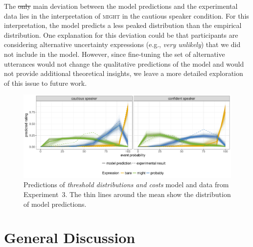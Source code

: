 \documentclass[man, floatsintext]{apa6}
\providecommand{\DIFdel}[1]{{\protect\color{red}\sout{#1}}}                      %
\providecommand{\DIFdelbegin}{} %
\providecommand{\DIFdelend}{} %
\newcommand{\DIFscaledelfig}{0.5}
\newlength{\DIFdelgraphicswidth} %
\newlength{\DIFdelgraphicsheight} %
\newcommand{\DIFdelincludegraphics}[2][]{%
\sbox{\DIFdelgraphicsbox}{\DIFOincludegraphics[#1]{#2}}%
\settoboxwidth{\DIFdelgraphicswidth}{\DIFdelgraphicsbox} %
\settoboxtotalheight{\DIFdelgraphicsheight}{\DIFdelgraphicsbox} %
\scalebox{\DIFscaledelfig}{%
\parbox[b]{\DIFdelgraphicswidth}{\usebox{\DIFdelgraphicsbox}\\[-\baselineskip] \rule{\DIFdelgraphicswidth}{0em}}\llap{\resizebox{\DIFdelgraphicswidth}{\DIFdelgraphicsheight}{%
\setlength{\unitlength}{\DIFdelgraphicswidth}%
\begin{picture}(1,1)%
\thicklines\linethickness{2pt} %
{\color[rgb]{1,0,0}\put(0,0){\framebox(1,1){}}}%
{\color[rgb]{1,0,0}\put(0,0){\line( 1,1){1}}}%
{\color[rgb]{1,0,0}\put(0,1){\line(1,-1){1}}}%
\end{picture}%
}\hspace*{3pt}}} %
} %
\DeclareRobustCommand{\DIFdelbegin}{\DIFOdelbegin \let\includegraphics\DIFdelincludegraphics} %
\DeclareRobustCommand{\DIFdelend}{\DIFOaddend \let\includegraphics\DIFOincludegraphics} %
\begin{document}
The \DIFdelbegin \DIFdel{only }\DIFdelend main deviation between the model predictions and the experimental data lies in the interpretation of \textsc{might} in the cautious speaker condition. For this interpretation, the model predicts a less peaked distribution than the empirical distribution.  One explanation for this deviation could be that participants are considering alternative uncertainty expressions (e.g., \textit{very unlikely}) that we did not include in the model.  However, since fine-tuning the set of alternative utterances would not change the qualitative predictions of the model and would not provide additional theoretical insights, we leave a more detailed exploration of this issue to future work. 

\begin{figure}
\includegraphics[width=\textwidth]{plots/adaptation-posterior-comp-data.pdf}
\caption{Predictions of \textit{threshold distributions and costs} model and data from Experiment~3. The thin lines around the mean show the distribution of model predictions.  \label{fig:post-exposure-comp-data}}
\end{figure}

\section{General Discussion}
\end{document}
